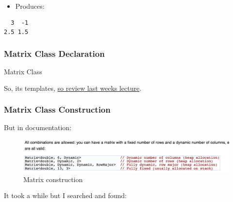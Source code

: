 \begin{itemize}
\itemsep1pt\parskip0pt
\item
  Produces:
\end{itemize}

\begin{verbatim}
  3  -1
2.5 1.5
\end{verbatim}

\subsubsection{Matrix Class Declaration}\label{matrix-class-declaration}

Matrix Class

\begin{Shaded}
\begin{Highlighting}[]
\NormalTok{<}      
 
  \NormalTok{: } 
\NormalTok{\{}
\end{Highlighting}
\end{Shaded}

So, its templates,
\href{http://development.rc.ucl.ac.uk/training/rcwithcpp/session02/}{so
review last weeks lecture}.

\subsubsection{Matrix Class
Construction}\label{matrix-class-construction}

But in documentation:

\begin{figure}[htbp]
\centering
\includegraphics{88cpplibraries/figures/eigenMatrixDynamic.png}
\caption{Matrix construction}
\end{figure}

It took a while but I searched and found:

\begin{Shaded}
\begin{Highlighting}[]
  \NormalTok{;}
\end{Highlighting}
\end{Shaded}

